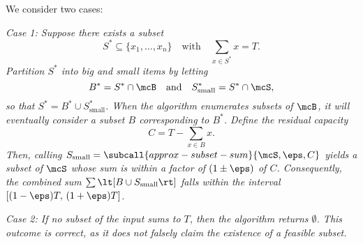 \documentclass{article}
\begin{document}
\begin{solution}
  \begin{subproof}[Correctness]
  We consider two cases:

    \it{Case 1:} Suppose there exists a subset
    \[
    S^* \subseteq \{x_1, \dots, x_n\} \quad \text{with} \quad \sum_{x \in S^*} x = T.
    \]
    Partition \( S^* \) into big and small items by letting
    \[
    B^* = S^* \cap \mcB \quad \text{and} \quad S^*_{\text{small}} = S^* \cap \mcS,
    \]
    so that \( S^* = B^* \cup S^*_{\text{small}} \).
    When the algorithm enumerates subsets of \( \mcB \), it will eventually consider a subset \( B \) corresponding to \( B^* \).
    Define the residual capacity
    \[
    C = T - \sum_{x \in B} x.
    \]
    Then, calling \( S_{\text{small}} = \subcall{approx-subset-sum}{\mcS, \eps, C} \) yields a subset of \( \mcS \) whose sum is within a factor of \( (1\pm\eps) \) of \( C \).
    Consequently, the combined sum \( \sum \lt[B \cup S_{\text{small}}\rt] \) falls within the interval \( [(1-\eps)T,\,(1+\eps)T] \).

    \it{Case 2:} If no subset of the input sums to \( T \), then the algorithm returns \( \emptyset \).
    This outcome is correct, as it does not falsely claim the existence of a feasible subset.
  \end{subproof}
\end{solution}
\pagebreak
\end{document}
